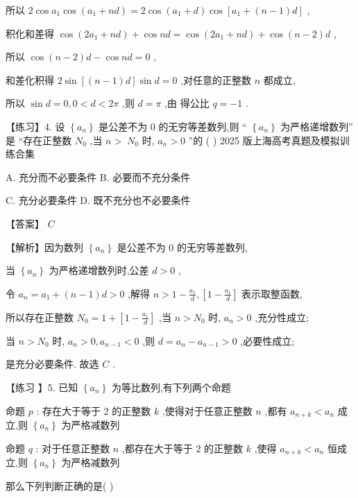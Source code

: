 \documentclass[10pt]{article}
\newcommand*\circled[1]{\tikz[baseline=(char.base)]{\node[shape=circle,draw,inner sep=1.5pt] (char) {\small #1};}}
\begin{document}
所以 \(2\cos {a}_{1}\cos \left( {{a}_{1} + {nd}}\right)  = 2\cos \left( {{a}_{1} + d}\right) \cos \left\lbrack  {{a}_{1} + \left( {n - 1}\right) d}\right\rbrack\) ,

积化和差得 \(\cos \left( {2{a}_{1} + {nd}}\right)  + \cos {nd} = \cos \left( {2{a}_{1} + {nd}}\right)  + \cos \left( {n - 2}\right) d\) ,

所以 \(\cos \left( {n - 2}\right) d - \cos {nd} = 0\) ,

和差化积得 \(2\sin \left\lbrack  {\left( {n - 1}\right) d}\right\rbrack  \sin d = 0\) ,对任意的正整数 \(n\) 都成立,

所以 \(\sin d = 0,0 < d < {2\pi }\) ,则 \(d = \pi\) ,由 \circled{1} 得公比 \(q =  - 1\) .

【练习】4. 设 \(\left\{  {a}_{n}\right\}\) 是公差不为 0 的无穷等差数列,则 “ \(\left\{  {a}_{n}\right\}\) 为严格递增数列” 是 “存在正整数 \({N}_{0}\) ,当 \(n > \; {N}_{0}\) 时, \({a}_{n} > 0\) ”的 ( ) 2025 版上海高考真题及模拟训练合集

A. 充分而不必要条件 B. 必要而不充分条件

C. 充分必要条件 D. 既不充分也不必要条件

【答案】 \(C\)

【解析】因为数列 \(\left\{  {a}_{n}\right\}\) 是公差不为 0 的无穷等差数列,

当 \(\left\{  {a}_{n}\right\}\) 为严格递增数列时,公差 \(d > 0\) ,

令 \({a}_{n} = {a}_{1} + \left( {n - 1}\right) d > 0\) ,解得 \(n > 1 - \frac{{a}_{1}}{d},\left\lbrack  {1 - \frac{{a}_{1}}{d}}\right\rbrack\) 表示取整函数,

所以存在正整数 \({N}_{0} = 1 + \left\lbrack  {1 - \frac{{a}_{1}}{d}}\right\rbrack\) ,当 \(n > {N}_{0}\) 时, \({a}_{n} > 0\) ,充分性成立;

当 \(n > {N}_{0}\) 时, \({a}_{n} > 0,{a}_{n - 1} < 0\) ,则 \(d = {a}_{n} - {a}_{n - 1} > 0\) ,必要性成立;

是充分必要条件. 故选 \(C\) .

【练习 】5. 已知 \(\left\{  {a}_{n}\right\}\) 为等比数列,有下列两个命题

命题 \(p\) : 存在大于等于 2 的正整数 \(k\) ,使得对于任意正整数 \(n\) ,都有 \({a}_{n + k} < {a}_{n}\) 成立,则 \(\left\{  {a}_{n}\right\}\) 为严格减数列

命题 \(q\) : 对于任意正整数 \(n\) ,都存在大于等于 2 的正整数 \(k\) ,使得 \({a}_{n + k} < {a}_{n}\) 恒成立,则 \(\left\{  {a}_{n}\right\}\) 为严格减数列

那么下列判断正确的是( )
\end{document}
